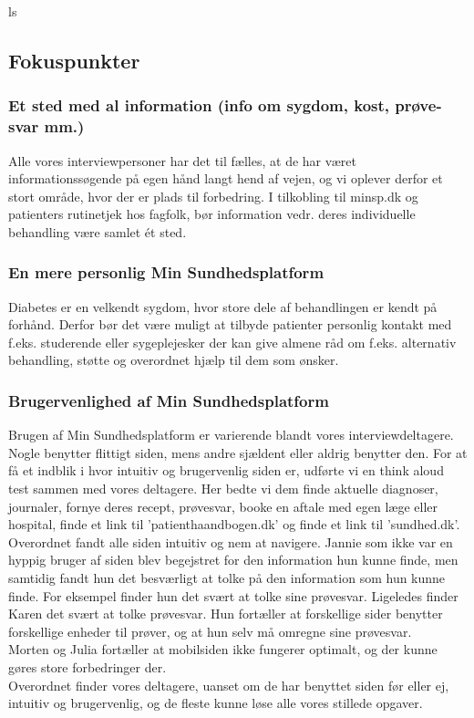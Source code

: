 ls
\subsection{Fokuspunkter}
\subsubsection{Et sted med al information (info om sygdom, kost, prøve-svar mm.)}
Alle vores interviewpersoner har det til fælles, at de har været informationssøgende på egen hånd langt hend af vejen, og vi oplever derfor et stort område, hvor der er plads til forbedring. I tilkobling til minsp.dk og patienters rutinetjek hos fagfolk, bør information vedr. deres individuelle behandling være samlet ét sted.

\subsubsection{En mere personlig Min Sundhedsplatform}
Diabetes er en velkendt sygdom, hvor store dele af behandlingen er kendt på forhånd. Derfor bør det være muligt at tilbyde patienter personlig kontakt med f.eks. studerende eller sygeplejesker der kan give almene råd om f.eks. alternativ behandling, støtte og overordnet hjælp til dem som ønsker.

\subsubsection{Brugervenlighed af Min Sundhedsplatform}
Brugen af Min Sundhedsplatform er varierende blandt vores interviewdeltagere. Nogle benytter flittigt siden, mens andre sjældent eller aldrig benytter den. For at få et indblik i hvor intuitiv og brugervenlig siden er, udførte vi en think aloud test sammen med vores deltagere. Her bedte vi dem finde aktuelle diagnoser, journaler, fornye deres recept, prøvesvar, booke en aftale med egen læge eller hospital, finde et link til 'patienthaandbogen.dk' og finde et link til 'sundhed.dk'. Overordnet fandt alle siden intuitiv og nem at navigere. Jannie som ikke var en hyppig bruger af siden blev begejstret for den information hun kunne finde, men samtidig fandt hun det besværligt at tolke på den information som hun kunne finde. For eksempel finder hun det svært at tolke sine prøvesvar. Ligeledes finder Karen det svært at tolke prøvesvar. Hun fortæller at forskellige sider benytter forskellige enheder til prøver, og at hun selv må omregne sine prøvesvar.\\
Morten og Julia fortæller at mobilsiden ikke fungerer optimalt, og der kunne gøres store forbedringer der.\\
Overordnet finder vores deltagere, uanset om de har benyttet siden før eller ej, intuitiv og brugervenlig, og de fleste kunne løse alle vores stillede opgaver.

